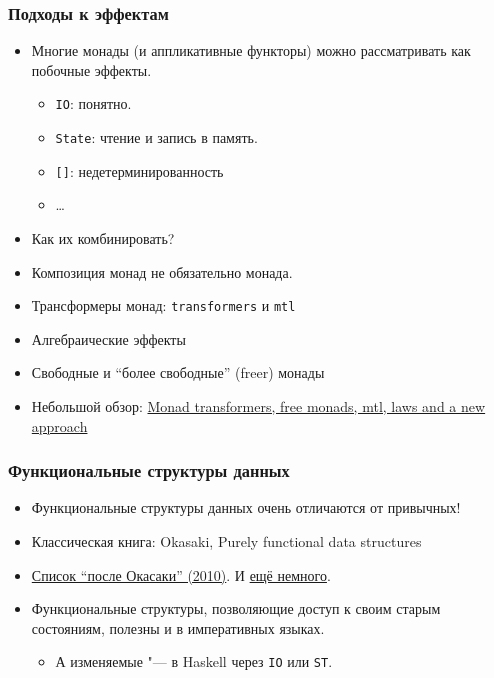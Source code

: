 \documentclass[11pt]{beamer}
\begin{document}
\begin{frame}[fragile]
\frametitle{Подходы к эффектам}
\begin{itemize}
    \item Многие монады (и аппликативные функторы) можно рассматривать как побочные эффекты.
    \begin{itemize}
        \item \lstinline|IO|: понятно.
        \item \lstinline|State|: чтение и запись в память.
        \item \lstinline|[]|: недетерминированность
        \item \ldots
    \end{itemize}
    \pause
    \item Как их комбинировать?
    \item Композиция монад не обязательно монада.
    \pause
    \item Трансформеры монад: \lstinline|transformers| и \lstinline|mtl|
    \item Алгебраические эффекты
    \item Свободные и \enquote{более свободные} (freer) монады
    \item Небольшой обзор: \href{https://ocharles.org.uk/posts/2016-01-26-transformers-free-monads-mtl-laws.html}{Monad transformers, free monads, mtl, laws and a new approach}
\end{itemize}
\end{frame}

\begin{frame}[fragile]
\frametitle{Функциональные структуры данных}
\begin{itemize}
    \item Функциональные структуры данных очень отличаются от привычных!
    \item Классическая книга: Okasaki, Purely functional data structures
    \item \href{https://cstheory.stackexchange.com/questions/1539/whats-new-in-purely-functional-data-structures-since-okasaki}{Список \enquote{после Окасаки} (2010)}. И \href{https://www.reddit.com/r/haskell/comments/a4wk1i/seminal_works_after_purely_functional_data/ebm30ra/}{ещё немного}.
    \pause
    \item Функциональные структуры, позволяющие доступ к своим старым состояниям, полезны и в императивных языках.
    \begin{itemize}
        \item А изменяемые "--- в Haskell через \lstinline|IO| или \lstinline|ST|.
    \end{itemize}
\end{itemize}
\end{frame}
\end{document}
